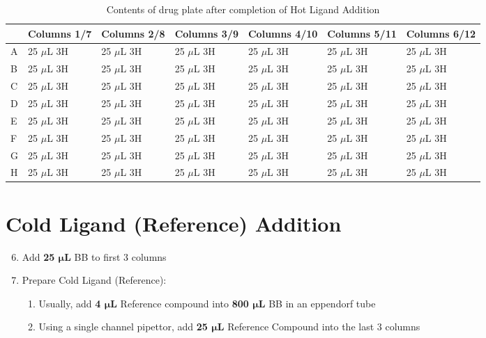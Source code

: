 \documentclass[12pt, letterpaper]{article}
\begin{document}
\begin{table}[h]
    \begin{center}
        \begin{tabular}{|l|lll|lll|}
        \hline
        & Columns 1/7         & Columns 2/8         & Columns 3/9         & Columns 4/10         & Columns 5/11         & Columns 6/12         \\ \hline
        A & 25 $\mu$L 3H        & 25 $\mu$L 3H        & 25 $\mu$L 3H        & 25 $\mu$L 3H         & 25 $\mu$L 3H         & 25 $\mu$L 3H         \\ \hline
        B & 25 $\mu$L 3H        & 25 $\mu$L 3H        & 25 $\mu$L 3H        & 25 $\mu$L 3H         & 25 $\mu$L 3H         & 25 $\mu$L 3H         \\ \hline
        C & 25 $\mu$L 3H        & 25 $\mu$L 3H        & 25 $\mu$L 3H        & 25 $\mu$L 3H         & 25 $\mu$L 3H         & 25 $\mu$L 3H         \\ \hline
        D & 25 $\mu$L 3H        & 25 $\mu$L 3H        & 25 $\mu$L 3H        & 25 $\mu$L 3H         & 25 $\mu$L 3H         & 25 $\mu$L 3H         \\ \hline
        E & 25 $\mu$L 3H        & 25 $\mu$L 3H        & 25 $\mu$L 3H        & 25 $\mu$L 3H         & 25 $\mu$L 3H         & 25 $\mu$L 3H         \\ \hline
        F & 25 $\mu$L 3H        & 25 $\mu$L 3H        & 25 $\mu$L 3H        & 25 $\mu$L 3H         & 25 $\mu$L 3H         & 25 $\mu$L 3H         \\ \hline
        G & 25 $\mu$L 3H        & 25 $\mu$L 3H        & 25 $\mu$L 3H        & 25 $\mu$L 3H         & 25 $\mu$L 3H         & 25 $\mu$L 3H         \\ \hline
        H & 25 $\mu$L 3H        & 25 $\mu$L 3H        & 25 $\mu$L 3H        & 25 $\mu$L 3H         & 25 $\mu$L 3H         & 25 $\mu$L 3H         \\ \hline
        \end{tabular}
    \caption{Contents of drug plate after completion of Hot Ligand Addition}
    \end{center}
\end{table}

\section{Cold Ligand (Reference) Addition}
\begin{enumerate}
    \setcounter{enumi}{5}
    \item Add \textbf{25 $\bm{\mu}$L} BB to first 3 columns
    \item Prepare Cold Ligand (Reference):
    \begin{enumerate}
        \item Usually, add \textbf{4 $\bm{\mu}$L} Reference compound into \textbf{800 $\bm{\mu}$L} BB in an eppendorf tube
        \item Using a single channel pipettor, add \textbf{25 $\bm{\mu}$L} Reference Compound into the last 3 columns
    \end{enumerate}
\end{enumerate}
\end{document}

